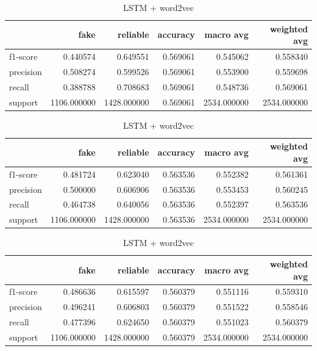 \begin{table}
\centering
\begin{subtable}{\textwidth}
\begin{tabular}{lrrrrr}
\toprule
{} &         fake &     reliable &  accuracy &    macro avg &  weighted avg \\
\midrule
f1-score  &     0.440574 &     0.649551 &  0.569061 &     0.545062 &      0.558340 \\
precision &     0.508274 &     0.599526 &  0.569061 &     0.553900 &      0.559698 \\
recall    &     0.388788 &     0.708683 &  0.569061 &     0.548736 &      0.569061 \\
support   &  1106.000000 &  1428.000000 &  0.569061 &  2534.000000 &   2534.000000 \\
\bottomrule
\end{tabular}
\caption{Simple LSTM}
\end{subtable}
\begin{subtable}{\textwidth}
 \begin{tabular}{lrrrrr}
 \toprule
 {} &         fake &     reliable &  accuracy &    macro avg &  weighted avg \\
 \midrule
 f1-score  &     0.481724 &     0.623040 &  0.563536 &     0.552382 &      0.561361 \\
 precision &     0.500000 &     0.606906 &  0.563536 &     0.553453 &      0.560245 \\
 recall    &     0.464738 &     0.640056 &  0.563536 &     0.552397 &      0.563536 \\
 support   &  1106.000000 &  1428.000000 &  0.563536 &  2534.000000 &   2534.000000 \\
 \bottomrule
 \end{tabular}
 \caption{LSTM + word2vec}
\end{subtable}
\begin{subtable}{\textwidth}
\begin{tabular}{lrrrrr}
\toprule
{} &         fake &     reliable &  accuracy &    macro avg &  weighted avg \\
\midrule
f1-score  &     0.486636 &     0.615597 &  0.560379 &     0.551116 &      0.559310 \\
precision &     0.496241 &     0.606803 &  0.560379 &     0.551522 &      0.558546 \\
recall    &     0.477396 &     0.624650 &  0.560379 &     0.551023 &      0.560379 \\
support   &  1106.000000 &  1428.000000 &  0.560379 &  2534.000000 &   2534.000000 \\

\end{tabular}
\end{subtable}
\end{table}
